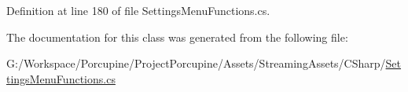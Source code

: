 Definition at line 180 of file Settings\+Menu\+Functions.\+cs.



The documentation for this class was generated from the following file\+:\begin{DoxyCompactItemize}
\item 
G\+:/\+Workspace/\+Porcupine/\+Project\+Porcupine/\+Assets/\+Streaming\+Assets/\+C\+Sharp/\hyperlink{_settings_menu_functions_8cs}{Settings\+Menu\+Functions.\+cs}\end{DoxyCompactItemize}
